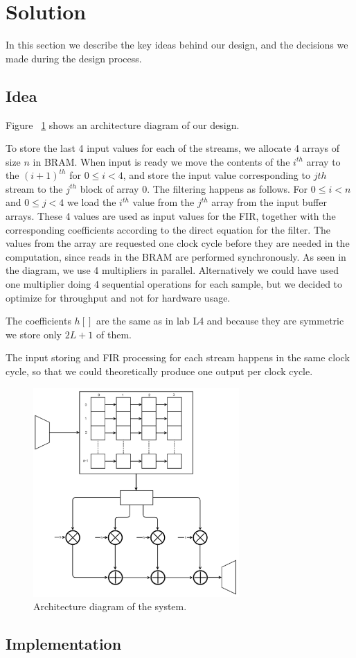 \section{Solution}
In this section we describe the key ideas behind our design, and the decisions we made during the design process.
\subsection{Idea}

Figure ~\ref{fig:architecture} shows an architecture diagram of our design.

To store the last 4 input values for each of the streams,  we allocate 4 arrays of size $n$ in BRAM. When input is ready we move the contents of the $i^{th}$ array to the $(i+1)^{th}$ for $0 \leq i < 4$, and store the input value corresponding to $j{th}$ stream to the $j^{th}$ block of array 0. The filtering happens as follows. For $0 \leq  i < n$ and $0 \leq j < 4$ we load the $i^{th}$ value from the $j^{th}$ array from the input buffer arrays.  These 4 values are used as input values for the FIR, together with the corresponding coefficients according to the direct equation for the filter. The values from the array are requested one clock cycle before they are needed in the computation, since reads in the BRAM are performed synchronously. As seen in the diagram, we use 4 multipliers in parallel. Alternatively we could have used one multiplier doing 4 sequential operations for each sample, but we decided to optimize for throughput and not for hardware usage.

The coefficients $h[]$ are the same as in lab L4 and because they are symmetric we store only $2L+1$ of them.

The input storing and FIR processing for each stream happens in the same clock cycle, so that we could theoretically produce one output per clock cycle.
\begin{figure}
\begin{center}
\includegraphics[width=0.7\textwidth]{images/architecture.png}
\caption{Architecture diagram of the system.}
\label{fig:architecture}
\end{center}
\end{figure}
\FloatBarrier
\subsection{Implementation}

